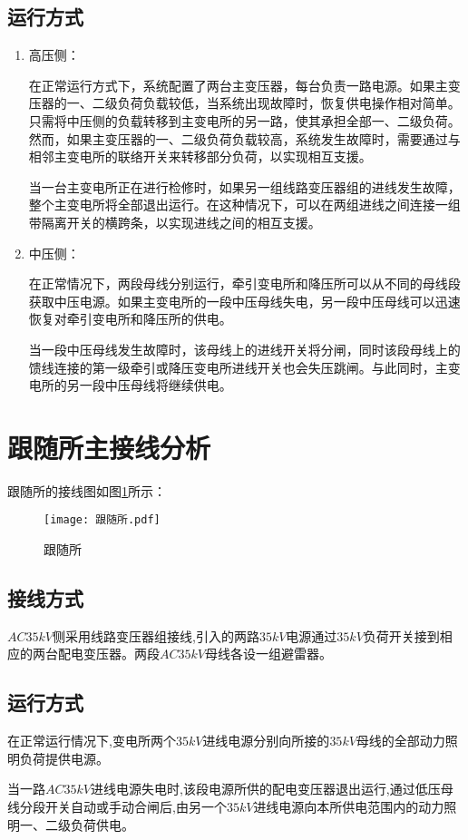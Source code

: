 \subsection{运行方式}
\begin{enumerate}
	\item 高压侧：
	
	 
	在正常运行方式下，系统配置了两台主变压器，每台负责一路电源。如果主变压器的一、二级负荷负载较低，当系统出现故障时，恢复供电操作相对简单。只需将中压侧的负载转移到主变电所的另一路，使其承担全部一、二级负荷。然而，如果主变压器的一、二级负荷负载较高，系统发生故障时，需要通过与相邻主变电所的联络开关来转移部分负荷，以实现相互支援。
	
	当一台主变电所正在进行检修时，如果另一组线路变压器组的进线发生故障，整个主变电所将全部退出运行。在这种情况下，可以在两组进线之间连接一组带隔离开关的横跨条，以实现进线之间的相互支援。
	
	\item 中压侧： 
	
	
	在正常情况下，两段母线分别运行，牵引变电所和降压所可以从不同的母线段获取中压电源。如果主变电所的一段中压母线失电，另一段中压母线可以迅速恢复对牵引变电所和降压所的供电。
	
	
	当一段中压母线发生故障时，该母线上的进线开关将分闸，同时该段母线上的馈线连接的第一级牵引或降压变电所进线开关也会失压跳闸。与此同时，主变电所的另一段中压母线将继续供电。
\end{enumerate}
\section{跟随所主接线分析}
跟随所的接线图如图\ref{跟随所}所示：
\begin{figure}[h]
	\centering
	\texttt{[image: 跟随所.pdf]}
	\caption{跟随所}
	\label{跟随所}
\end{figure}
\subsection{接线方式}
$AC35kV$侧采用线路变压器组接线,引入的两路$35kV$电源通过$35kV$负荷开关接到相应的两台配电变压器。两段$AC35kV$母线各设一组避雷器。

\subsection{运行方式}
在正常运行情况下,变电所两个$35kV$进线电源分别向所接的$35kV$母线的全部动力照明负荷提供电源。


当一路$AC35kV$进线电源失电时,该段电源所供的配电变压器退出运行,通过低压母线分段开关自动或手动合闸后,由另一个$35kV$进线电源向本所供电范围内的动力照明一、二级负荷供电。
